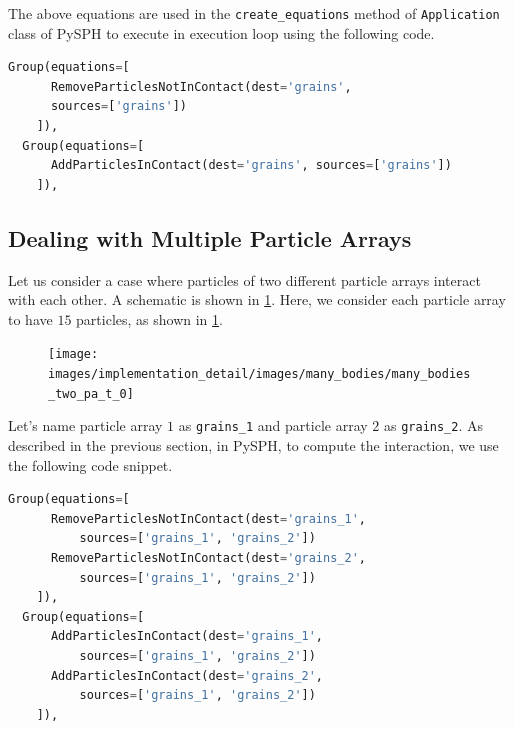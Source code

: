 The above equations are used in the \texttt{create\_equations} method of \texttt{Application}
class of PySPH to execute in execution loop using the following code.
 \lstset{basicstyle=\footnotesize\ttfamily}
\begin{lstlisting}[label={contact:equations},frame=lines,language=Python,upquote=True]
  Group(equations=[
      RemoveParticlesNotInContact(dest='grains',
      sources=['grains'])
    ]),
  Group(equations=[
      AddParticlesInContact(dest='grains', sources=['grains'])
    ]),
\end{lstlisting}


\subsection{Dealing with Multiple Particle Arrays}
Let us consider a case where particles of two different particle arrays
interact with each other. A schematic is shown in \cref{fig:mb:2_pa}. Here,
we consider each particle array to have $15$ particles, as shown in
\cref{fig:mb:2_pa}.
\begin{figure}[!htpb]
  \centering
  \texttt{[image: images/implementation\_detail/images/many\_bodies/many\_bodies\_two\_pa\_t\_0]}
  \caption{}
\label{fig:mb:2_pa}
\end{figure}
Let's name particle array $1$ as \texttt{grains\_1} and particle array $2$ as
\texttt{grains\_2}. As described in the previous section, in PySPH, to compute
the interaction, we use the following code snippet.
\lstset{basicstyle=\footnotesize\ttfamily}
\begin{lstlisting}[label={contact:equations},frame=lines,language=Python,upquote=True]
  Group(equations=[
      RemoveParticlesNotInContact(dest='grains_1',
          sources=['grains_1', 'grains_2'])
      RemoveParticlesNotInContact(dest='grains_2',
          sources=['grains_1', 'grains_2'])
    ]),
  Group(equations=[
      AddParticlesInContact(dest='grains_1',
          sources=['grains_1', 'grains_2'])
      AddParticlesInContact(dest='grains_2',
          sources=['grains_1', 'grains_2'])
    ]),
\end{lstlisting}


